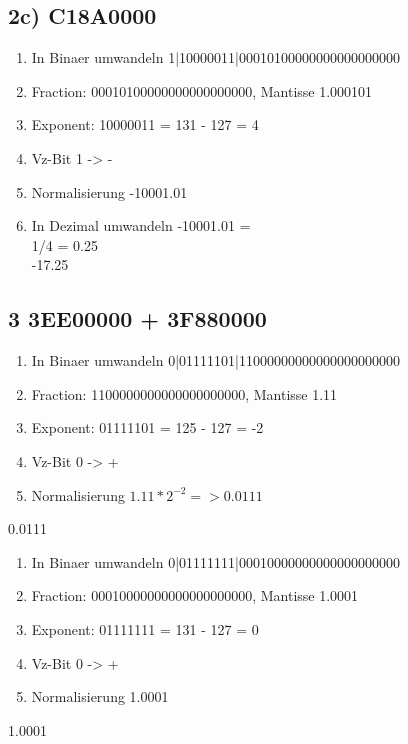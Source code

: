 \documentclass[]{article}
\providecommand{\tightlist}{%
  \setlength{\itemsep}{0pt}\setlength{\parskip}{0pt}}
\begin{document}
\subsection{2c) C18A0000}\label{c-c18a0000}

\begin{enumerate}
\tightlist
\item
  In Binaer umwandeln
  1|10000011|00010100000000000000000
\item
  Fraction: 00010100000000000000000, Mantisse 1.000101
\item
  Exponent: 10000011 = 131 - 127 = 4
\item
  Vz-Bit 1 -> -
\item
  Normalisierung -10001.01
\item
  In Dezimal umwandeln -10001.01 =\\
  1/4 = 0.25\\
  -17.25
\end{enumerate}

\pagebreak

\subsection{3 3EE00000 + 3F880000}\label{ee00000-3f880000}

\begin{enumerate}
\tightlist
\item
  In Binaer umwandeln
  0|01111101|11000000000000000000000
\item
  Fraction: 1100000000000000000000, Mantisse 1.11
\item
  Exponent: 01111101 = 125 - 127 = -2
\item
  Vz-Bit 0 -> +
\item
  Normalisierung $1.11 * 2^{-2} => 0.0111$
\end{enumerate}

0.0111

\begin{enumerate}
\tightlist
\item
  In Binaer umwandeln
  0|01111111|00010000000000000000000
\item
  Fraction: 00010000000000000000000, Mantisse 1.0001
\item
  Exponent: 01111111 = 131 - 127 = 0
\item
  Vz-Bit 0 -> +
\item
  Normalisierung 1.0001
\end{enumerate}

1.0001
\end{document}
